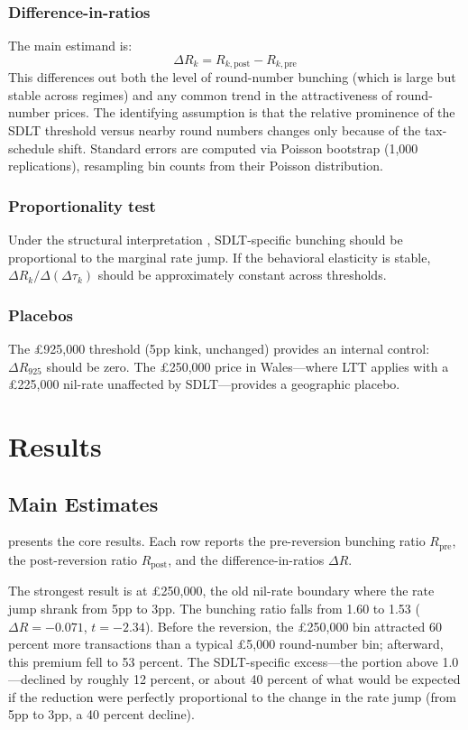 \documentclass[12pt]{article}
\begin{document}
\subsubsection*{Difference-in-ratios} The main estimand is:
\begin{equation}
\Delta R_k = R_{k,\text{post}} - R_{k,\text{pre}}
\end{equation}
This differences out both the level of round-number bunching (which is large but stable across regimes) and any common trend in the attractiveness of round-number prices. The identifying assumption is that the relative prominence of the SDLT threshold versus nearby round numbers changes only because of the tax-schedule shift. Standard errors are computed via Poisson bootstrap (1,000 replications), resampling bin counts from their Poisson distribution.

\subsubsection*{Proportionality test} Under the structural interpretation \citep{saez2010taxpayers, kleven2013using}, SDLT-specific bunching should be proportional to the marginal rate jump. If the behavioral elasticity is stable, $\Delta R_k / \Delta(\Delta \tau_k)$ should be approximately constant across thresholds.

\subsubsection*{Placebos} The \pounds 925,000 threshold (5pp kink, unchanged) provides an internal control: $\Delta R_{925}$ should be zero. The \pounds 250,000 price in Wales---where LTT applies with a \pounds 225,000 nil-rate unaffected by SDLT---provides a geographic placebo.


\section{Results}\label{sec:results}

\subsection{Main Estimates}

 presents the core results. Each row reports the pre-reversion bunching ratio $R_{\text{pre}}$, the post-reversion ratio $R_{\text{post}}$, and the difference-in-ratios $\Delta R$.

The strongest result is at \pounds 250,000, the old nil-rate boundary where the rate jump shrank from 5pp to 3pp. The bunching ratio falls from 1.60 to 1.53 ($\Delta R = -0.071$, $t = -2.34$). Before the reversion, the \pounds 250,000 bin attracted 60 percent more transactions than a typical \pounds 5,000 round-number bin; afterward, this premium fell to 53 percent. The SDLT-specific excess---the portion above 1.0---declined by roughly 12 percent, or about 40 percent of what would be expected if the reduction were perfectly proportional to the change in the rate jump (from 5pp to 3pp, a 40 percent decline).
\end{document}
